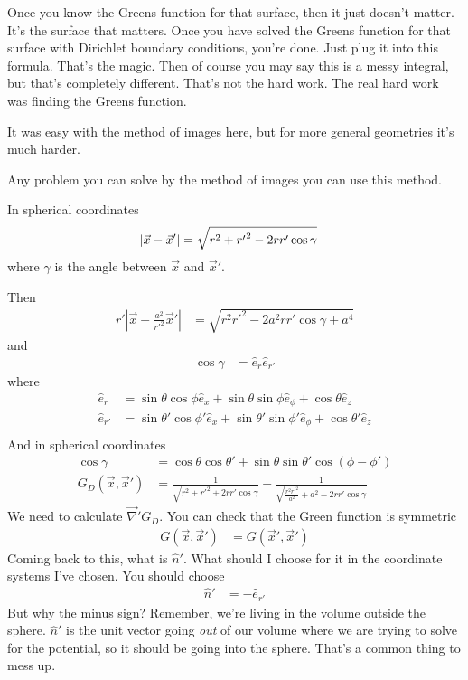 Once you know the Greens function for that surface,
then it just doesn't matter.
It's the surface that matters.
Once you have solved the Greens function for that surface with Dirichlet
boundary conditions,
you're done.
Just plug it into this formula.
That's the magic.
Then of course you may say this is a messy integral,
but that's completely different.
That's not the hard work.
The real hard work was finding the Greens function.

It was easy with the method of images here,
but for more general geometries it's much harder.

Any problem you can solve by the method of images you can use this method.

In spherical coordinates
\begin{align}
    \left|
    \vec{x} - \vec{x}'
    \right|
    &=
    \sqrt{%
    r^2 + {r'}^2
    - 2rr' \cos\gamma
    }
\end{align}
where $\gamma$ is the angle between $\vec{x}$ and $\vec{x}'$.

Then
\begin{align}
    r'
    \left|
    \vec{x}
    -
    \frac{a^2}{r'^2}\vec{x}'
    \right|
    &=
    \sqrt{
    r^2 r'^2 - 2a^2 rr' \cos\gamma
    + a^4
    }
\end{align}
and
\begin{align}
    \cos \gamma &= \hat{e}_r \hat{e}_{r'}
\end{align}
where
\begin{align}
    \hat{e}_r
    &=
    \sin\theta \cos\phi \hat{e}_x
    + \sin\theta \sin\phi \hat{e}_\phi
    + \cos\theta \hat{e}_z\\
    \hat{e}_{r'}
    &=
    \sin\theta' \cos\phi' \hat{e}_x
    + \sin\theta' \sin\phi' \hat{e}_\phi
    + \cos\theta' \hat{e}_z\\
\end{align}
And in spherical coordinates
\begin{align}
    \cos\gamma
    &=
    \cos\theta \cos\theta'
    + \sin\theta \sin\theta' \cos\left( \phi - \phi' \right)\\
    G_D\left( \vec{x}, \vec{x}' \right)
    &=
    \frac{1}{\sqrt{
    r^2 + r'^2 + 2r r' \cos\gamma
    }}
    -
    \frac{1}{\sqrt{
    \frac{r^2 r'^2}{a^2} 
    + a^2
    - 2 r r' \cos\gamma
    }}
\end{align}
We need to calculate $\vec{\nabla}'G_D$.
You can check that the Green function is symmetric
\begin{align}
    G\left( \vec{x}, \vec{x}' \right)
    &=
    G\left( \vec{x}', \vec{x}' \right)
\end{align}
Coming back to this,
what is $\hat{n}'$.
What should I choose for it in the coordinate systems I've chosen.
You should choose
\begin{align}
    \hat{n}' &= -\hat{e}_{r'}
\end{align}
But why the minus sign?
Remember,
we're living in the volume outside the sphere.
$\hat{n}'$ is the unit vector going \emph{out} of our volume
where we are trying to solve for the potential,
so it should be going into the sphere.
That's a common thing to mess up.

